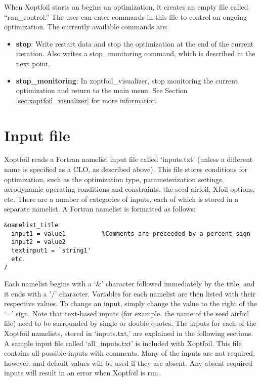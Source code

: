 \documentclass[11pt]{article}
\begin{document}
When Xoptfoil starts an begins an optimization, it creates an empty file called
``run\_control.'' The user can enter commands in this file to control an ongoing
optimization. The currently available commands are:

\begin{itemize}
\item{\textbf{stop}: Write restart data and stop the optimization at the end of the
current iteration. Also writes a stop\_monitoring command, which is described in the next
point.}
\item{\textbf{stop\_monitoring}: In xoptfoil\_visualizer, stop monitoring the current
optimization and return to the main menu. See Section \ref{sec:xoptfoil_visualizer} for
more information.}
\end{itemize}

\section{Input file}

Xoptfoil reads a Fortran namelist input file called `inputs.txt' (unless a different name
is specified as a CLO, as described above).  This file stores
conditions for optimization, such as the optimization type, parameterization settings,
aerodynamic operating conditions and constraints, the seed airfoil, Xfoil options, etc.
There are a number of categories of inputs, each of which is stored in a separate
namelist.  A Fortran namelist is formatted as follows:

\begin{verbatim}
&namelist_title
  input1 = value1          %Comments are preceeded by a percent sign
  input2 = value2
  textinput1 = `string1'
  etc.
/
\end{verbatim}

Each namelist begins with a `\&' character followed immediately by the title, and it ends with 
a '/' character.  Variables for each namelist are then listed with their respective
values.  To change an input, simply change the value to the right of the `=' sign.  Note
that text-based inputs (for example, the name of the seed airfoil file) need to be
surrounded by single or double quotes.  The inputs for each of the Xoptfoil namelists,
stored in `inputs.txt,' are explained in the following sections. A sample input file
called `all\_inputs.txt' is included with Xoptfoil. This file contains all possible
inputs with comments. Many of the inputs are not required, however, and default values
will be used if they are absent. Any absent required inputs will result in an error when
Xoptfoil is run.
\end{document}
